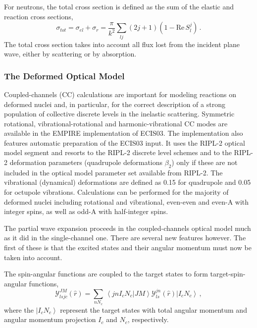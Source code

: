 \documentclass[twocolumn,amsmath,amssymb,10pt,groupedaddress,a4paper]{revtex4}
\begin{document}
For neutrons, the total cross section is defined as the sum of the
elastic and reaction cross sections, \begin{equation}
\sigma_{tot}=\sigma_{el}+\sigma_{r}=\frac{\pi}{k^{2}}\sum_{lj}(2j+1)(1-\textrm{Re}\, S_{l}^{j})\,.\end{equation}
 The total cross section takes into account all flux lost from the
incident plane wave, either by scattering or by absorption.

\subsubsection{The Deformed Optical Model\label{sec:DWBA-CC}}

Coupled-channels (CC) calculations are important for modeling
reactions on deformed nuclei and,
in particular, for the correct description of a strong population
of collective discrete levels in the inelastic scattering. Symmetric
rotational, vibrational-rotational and harmonic-vibrational CC modes
are available in the EMPIRE implementation of ECIS03. The
implementation also features automatic preparation of
the ECIS03 input. It uses the RIPL-2 \cite{RIPL2} optical
model segment and resorts to the RIPL-2 discrete level schemes and
to the RIPL-2 deformation parameters (quadrupole deformations $\beta_{2}$)
only if these are not included in the optical model parameter set
available from RIPL-2. The vibrational (dynamical) deformations are
defined as 0.15 for quadrupole and 0.05 for octupole vibrations. Calculations
can be performed for the majority of deformed nuclei including rotational
and vibrational, even-even and even-A with integer spins, as well
as odd-A with half-integer spins.

The partial wave expansion proceeds in the coupled-channels optical
model much as it did in the single-channel one. There are several
new features however. The first of these is that the excited states
and their angular momentum must now be taken into account.

The spin-angular functions
are coupled to the target states to form target-spin-angular functions,
\begin{equation}
{\mathcal{Y}}_{lsjc}^{JM}(\hat{r})=\sum_{nN_{c}}\,\left\langle jnI_{c}N_{c}|JM\right\rangle {\mathcal{Y}}_{ls}^{jn}(\hat{r})\left|I_{c}N_{c}\right\rangle \,,\end{equation}
 where the $\left|I_{c}N_{c}\right\rangle $ represent the target
states with total angular momentum and angular momentum projection
$I_{c}$ and $N_{c}$, respectively.
\end{document}
